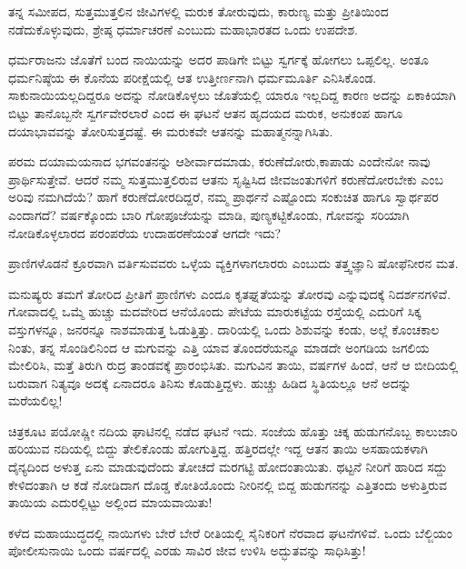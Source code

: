 
ತನ್ನ ಸಮೀಪದ, ಸುತ್ತಮುತ್ತಲಿನ ಜೀವಿಗಳಲ್ಲಿ ಮರುಕ ತೋರುವುದು, ಕಾರುಣ್ಯ ಮತ್ತು ಪ್ರೀತಿಯಿಂದ ನಡೆದುಕೊಳ್ಳುವುದು, ಶ್ರೇಷ್ಠ ಧರ್ಮಾಚರಣೆ ಎಂಬುದು ಮಹಾಭಾರತದ ಒಂದು ಉಪದೇಶ.

\vskip 2pt

ಧರ್ಮರಾಜನು ಜೊತೆಗೆ ಬಂದ ನಾಯಿಯನ್ನು ಅದರ ಪಾಡಿಗೇ ಬಿಟ್ಟು ಸ್ವರ್ಗಕ್ಕೆ ಹೋಗಲು ಒಪ್ಪಲಿಲ್ಲ. ಅಂತೂ ಧರ್ಮನಿಷ್ಠೆಯ ಈ ಕೊನೆಯ ಪರೀಕ್ಷೆಯಲ್ಲಿ ಆತ ಉತ್ತೀರ್ಣನಾಗಿ ಧರ್ಮ\-ಮೂರ್ತಿ ಎನಿಸಿಕೊಂಡ. ಸಾಕುನಾಯಿಯಲ್ಲದಿದ್ದರೂ ಅದನ್ನು ನೋಡಿಕೊಳ್ಳಲು ಜೊತೆಯಲ್ಲಿ ಯಾರೂ ಇಲ್ಲದಿದ್ದ ಕಾರಣ ಅದನ್ನು ಏಕಾಕಿಯಾಗಿ ಬಿಟ್ಟು ತಾನೊಬ್ಬನೇ ಸ್ವರ್ಗವೇರಲಾರೆ ಎಂದ ಈ ಘಟನೆ ಆತನ ಹೃದಯದ ಮರುಕ, ಅನುಕಂಪ ಹಾಗೂ ದಯಾಭಾವವನ್ನು ತೋರಿಸುತ್ತದಷ್ಟೆ. ಈ ಮರುಕವೇ ಆತನನ್ನು ಮಹಾತ್ಮನನ್ನಾಗಿಸಿತು.

\vskip 2pt

ಪರಮ ದಯಾಮಯನಾದ ಭಗವಂತನನ್ನು ಆಶೀರ್ವಾದಮಾಡು, ಕರುಣೆದೋರು,\break ಕಾಪಾಡು ಎಂದೇನೋ ನಾವು ಪ್ರಾರ್ಥಿಸುತ್ತೇವೆ. ಆದರೆ ನಮ್ಮ ಸುತ್ತಮುತ್ತಲಿರುವ ಆತನು ಸೃಷ್ಟಿಸಿದ ಜೀವಜಂತುಗಳಿಗೆ ಕರುಣೆ\-ದೋರಬೇಕು ಎಂಬ ಅರಿವು ನಮಗಿದೆಯೆ? ಹಾಗೆ ಕರುಣೆ\-ದೋರದಿದ್ದರೆ, ನಮ್ಮ ಪ್ರಾರ್ಥನೆ ಎಷ್ಟೊಂದು ಸಂಕುಚಿತ ಹಾಗೂ ಸ್ವಾರ್ಥಪರ ಎಂದಾಗದೆ? ವರ್ಷಕ್ಕೊಂದು ಬಾರಿ ಗೋಪೂಜೆಯನ್ನು ಮಾಡಿ, ಪುಣ್ಯಕಟ್ಟಿಕೊಂಡು, ಗೋವನ್ನು ಸರಿಯಾಗಿ ನೋಡಿಕೊಳ್ಳಲಾರದ ಪರಂಪರೆಯ ಉದಾಹರಣೆಯಂತೆ ಆಗದೇ ಇದು?

\vskip 2pt

ಪ್ರಾಣಿಗಳೊಡನೆ ಕ್ರೂರವಾಗಿ ವರ್ತಿಸುವವರು ಒಳ್ಳೆಯ ವ್ಯಕ್ತಿಗಳಾಗಲಾರರು ಎಂಬುದು ತತ್ತ್ವಜ್ಞಾನಿ ಷೋಫೆನೀರನ ಮತ.

\vskip 2pt

ಮನುಷ್ಯರು ತಮಗೆ ತೋರಿದ ಪ್ರೀತಿಗೆ ಪ್ರಾಣಿಗಳು ಎಂದೂ ಕೃತಘ್ನತೆಯನ್ನು ತೋರವು ಎನ್ನುವುದಕ್ಕೆ ನಿದರ್ಶನಗಳಿವೆ. ಗೋವಾದಲ್ಲಿ ಒಮ್ಮೆ ಹುಚ್ಚು ಮದವೇರಿದ ಆನೆಯೊಂದು ಪೇಟೆಯ ಮಾರುಕಟ್ಟೆಯ ರಸ್ತೆಯಲ್ಲಿ ಎದುರಿಗೆ ಸಿಕ್ಕ ವಸ್ತುಗಳನ್ನೂ, ಜನರನ್ನೂ ನಾಶಮಾಡುತ್ತ ಓಡುತ್ತಿತ್ತು. ದಾರಿಯಲ್ಲಿ ಒಂದು ಶಿಶುವನ್ನು ಕಂಡು, ಅಲ್ಲೆ ಕೊಂಚಕಾಲ ನಿಂತು, ತನ್ನ ಸೊಂಡಿಲಿನಿಂದ ಆ ಮಗುವನ್ನು ಎತ್ತಿ ಯಾವ ತೊಂದರೆಯನ್ನೂ ಮಾಡದೇ ಅಂಗಡಿಯ ಜಗಲಿಯ ಮೇಲಿರಿಸಿ, ಮತ್ತೆ ತಿರುಗಿ ರುದ್ರ ತಾಂಡವಕ್ಕೆ ಪ್ರಾರಂಭಿಸಿತು. ಮಗುವಿನ ತಾಯಿ, ವರ್ಷಗಳ ಹಿಂದೆ, ಆನೆ ಆ ಬೀದಿಯಲ್ಲಿ ಬರುವಾಗ ನಿತ್ಯವೂ ಅದಕ್ಕೆ ಏನಾದರೂ ತಿನಿಸು ಕೊಡುತ್ತಿದ್ದಳು. ಹುಚ್ಚು ಹಿಡಿದ ಸ್ಥಿತಿಯಲ್ಲೂ ಆನೆ ಅದನ್ನು ಮರೆಯಲಿಲ್ಲ!

ಚಿತ್ರಕೂಟ ಪಯೋಷ್ಣೀ ನದಿಯ ಘಾಟಿನಲ್ಲಿ ನಡೆದ ಘಟನೆ ಇದು. ಸಂಜೆಯ ಹೊತ್ತು ಚಿಕ್ಕ ಹುಡುಗನೊಬ್ಬ ಕಾಲುಜಾರಿ ಹರಿಯುವ ನದಿಯಲ್ಲಿ ಬಿದ್ದು ತೇಲಿಕೊಂಡು ಹೋಗುತ್ತಿದ್ದ. ಹತ್ತಿರದಲ್ಲೇ ಇದ್ದ ಆತನ ತಾಯಿ ಅಸಹಾಯಕಳಾಗಿ ದೈನ್ಯದಿಂದ ಅಳುತ್ತ ಏನು ಮಾಡುವುದೆಂದು ತೋಚದೆ ಮರಗಟ್ಟಿ ಹೋದಂತಾಯಿತು. ಥಟ್ಟನೆ ನೀರಿಗೆ ಹಾರಿದ ಸದ್ದು ಕೇಳಿದಂತಾಗಿ ಆ ಕಡೆ ನೋಡಿದಾಗ ದೊಡ್ಡ ಕೋತಿಯೊಂದು ನೀರಿನಲ್ಲಿ ಬಿದ್ದ ಹುಡುಗನನ್ನು ಎತ್ತಿತಂದು ಅಳುತ್ತಿರುವ ತಾಯಿಯ ಎದುರಲ್ಲಿಟ್ಟು ಅಲ್ಲಿಂದ ಮಾಯವಾಯಿತು!

ಕಳೆದ ಮಹಾಯುದ್ಧದಲ್ಲಿ ನಾಯಿಗಳು ಬೇರೆ ಬೇರೆ ರೀತಿಯಲ್ಲಿ ಸೈನಿಕರಿಗೆ ನೆರವಾದ ಘಟನೆಗಳಿವೆ. ಒಂದು ಬೆಲ್ಜಿಯಂ ಪೋಲೀಸುನಾಯಿ ಒಂದು ವರ್ಷದಲ್ಲಿ ಎರಡು ಸಾವಿರ ಜೀವ ಉಳಿಸಿ ಅದ್ಭುತವನ್ನು ಸಾಧಿಸಿತ್ತು!

